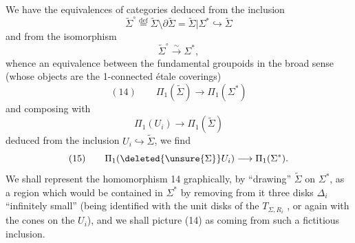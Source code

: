 We have the equivalences of categories
deduced from the inclusion
\[
\widetilde\Sigma^\circ \overset{\mathrm{def}}= \widetilde\Sigma\setminus\partial\widetilde\Sigma = \widetilde\Sigma|\Sigma^* \hookrightarrow \widetilde\Sigma
\]
and from the isomorphism
\[
\widetilde\Sigma^\circ \xrightarrow{\sim} \Sigma^*,
\]
whence an equivalence between the fundamental groupoids in the broad sense (whose objects are the 1-connected étale coverings)
\[
(14)\qquad \Pi_1(\widetilde\Sigma) \longrightarrow \Pi_1(\Sigma^*)
\]
and composing with
\[
\Pi_1(U_i)\longrightarrow \Pi_1(\widetilde\Sigma)
\]
deduced from the inclusion $U_i\hookrightarrow\widetilde\Sigma$, we find
\[
(15)\qquad \Pi_1(\deleted{\unsure{\Sigma}}U_i)\longrightarrow\Pi_1(\Sigma^*).
\]
We shall represent the homomorphism 14 graphically, by ``drawing'' $\widetilde\Sigma$ on $\Sigma^*$, as a region which would be contained in $\Sigma^*$ by removing from it  three  disks $\Delta_i$ ``infinitely small''  (being identified with the unit disks of the $T_{\Sigma,R_i}$ , or again with the cones on the $U_i$), and we shall picture (14) as coming from such a fictitious inclusion.
